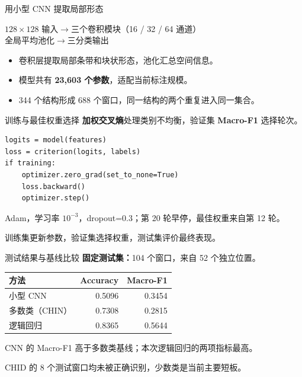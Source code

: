 \begin{frame}{用小型 CNN 提取局部形态}
\begin{center}
$128\times128$ 输入\quad $\longrightarrow$\quad 三个卷积模块（16 / 32 / 64 通道）\\[1.1em]
全局平均池化\quad $\longrightarrow$\quad 三分类输出
\end{center}
\vspace{1.0em}
\begin{itemize}
\item 卷积层提取局部条带和块状形态，池化汇总空间信息。
\item 模型共有 \textbf{23,603 个参数}，适配当前标注规模。
\item 344 个结构形成 688 个窗口，同一结构的两个重复进入同一集合。
\end{itemize}
\end{frame}

\begin{frame}[fragile]{训练与最佳权重选择}
\textbf{加权交叉熵}处理类别不均衡，验证集 \textbf{Macro-F1} 选择轮次。
\begin{lstlisting}
logits = model(features)
loss = criterion(logits, labels)
if training:
    optimizer.zero_grad(set_to_none=True)
    loss.backward()
    optimizer.step()
\end{lstlisting}
\vspace{0.3em}
\small Adam，学习率 $10^{-3}$，dropout=0.3；第 20 轮早停，最佳权重来自第 12 轮。\par
\small 训练集更新参数，验证集选择权重，测试集评价最终表现。
\end{frame}

\begin{frame}{测试结果与基线比较}
\textbf{固定测试集：}104 个窗口，来自 52 个独立位置。
\vspace{0.9em}
\begin{center}
\begin{tabular}{lrr}
\toprule
方法 & Accuracy & Macro-F1 \\
\midrule
小型 CNN & 0.5096 & 0.3454 \\
多数类（CHIN） & 0.7308 & 0.2815 \\
逻辑回归 & 0.8365 & 0.5644 \\
\bottomrule
\end{tabular}
\end{center}
\vspace{0.8em}
\small
CNN 的 Macro-F1 高于多数类基线；本次逻辑回归的两项指标最高。\par\vspace{0.6em}
CHID 的 8 个测试窗口均未被正确识别，少数类是当前主要短板。\par
\end{frame}
